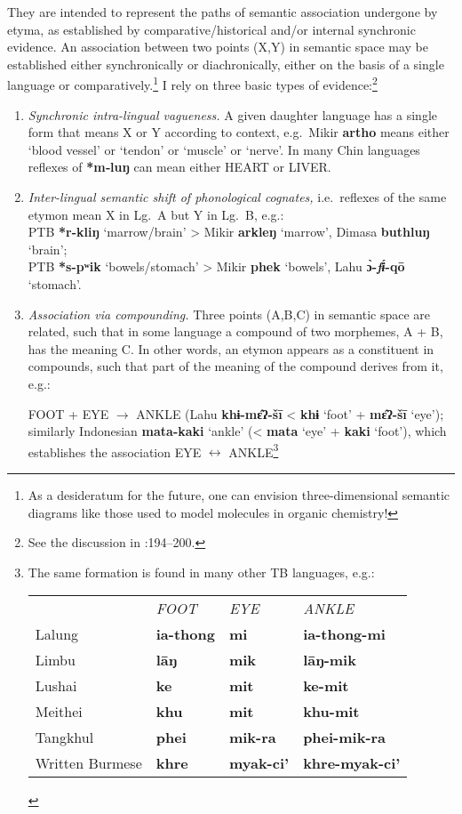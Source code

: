 They are intended to represent the paths of semantic association undergone by etyma,
as established by comparative/historical and/or internal synchronic evidence. An
association between two points (X,Y) in semantic space may be established either
synchronically or diachronically, either on the basis of a single language or
comparatively.\footnote{As a desideratum for the future, one can envision
three-dimensional semantic diagrams like those used to model molecules in
organic chemistry!}  I rely on three basic types of evidence:\footnote{See the
discussion in \textit{}:194–200.}
\begin{enumerate}
\item
\textit{Synchronic intra-lingual vagueness.} A given daughter language has a single
form that means X or Y according to context, e.g.\ 
Mikir \textbf{artho} means either ‘blood vessel’ or ‘tendon’ or ‘muscle’ or ‘nerve’.
In many Chin languages reflexes of \textbf{*m‑luŋ} can mean either HEART or LIVER.
\item
\textit{Inter-lingual semantic shift of phonological cognates,} i.e.\ reflexes of the
same etymon mean X in Lg.~A but Y in Lg.~B, e.g.:\\
\hspace*{2ex}PTB \textbf{*r-kliŋ} ‘marrow/brain’ > Mikir \textbf{arkleŋ} ‘marrow’, Dimasa \textbf{buthluŋ} ‘brain’;\\
\hspace*{2ex}PTB \textbf{*s-pʷik} ‘bowels/stomach’ > Mikir \textbf{phek} ‘bowels’, Lahu \textbf{ɔ̀-\textit{fɨ́}-qō} ‘stomach’.
\item
\textit{Association via compounding.}  Three points (A,B,C) in semantic space are
related, such that in some language a compound of two morphemes, A + B, has the
meaning C. In other words, an etymon appears as a constituent in compounds,
such that part of the meaning of the compound derives from it, e.g.:

FOOT + EYE $\to$ ANKLE (Lahu \textbf{khɨ-mɛ̂ʔ-šī} < \textbf{khɨ} ‘foot’ + \textbf{mɛ̂ʔ-šī} ‘eye’);
similarly Indonesian \textbf{mata-kaki} ‘ankle’ (< \textbf{mata} ‘eye’ + \textbf{kaki} ‘foot’), which
establishes the association EYE $\longleftrightarrow$ ANKLE\footnote{The same formation is
found in many other TB languages, e.g.:

\begin{tabular}{llll}
				&\textit{FOOT}	&\textit{EYE}	&\textit{ANKLE}\\
Lalung			&\textbf{ia-thong}	&\textbf{mi}	&\textbf{ia-thong-mi}\\
Limbu			&\textbf{lāŋ}	&\textbf{mik}	&\textbf{lāŋ-mik}\\
Lushai			&\textbf{ke}		&\textbf{mit}	&\textbf{ke-mit}\\
Meithei			&\textbf{khu}	&\textbf{mit}	&\textbf{khu-mit}\\
Tangkhul		&\textbf{phei}	&\textbf{mik-ra}	&\textbf{phei-mik-ra}\\
Written Burmese	&\textbf{khre}	&\textbf{myak-ci'}	&\textbf{khre-myak-ci'}\\
\end{tabular}}
\end{enumerate}

